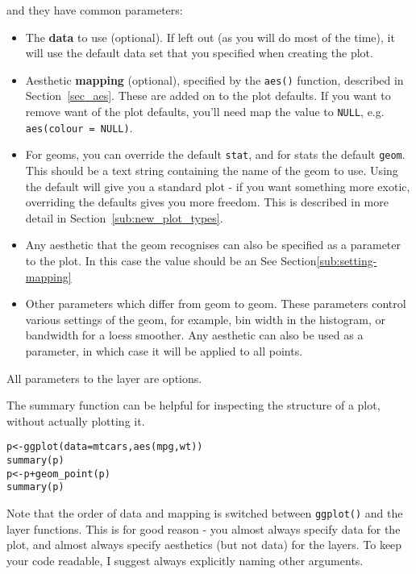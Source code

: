 \noindent and they have common parameters:

\begin{itemize}
	\item The {\bf data} to use (optional).  If left out (as you will do most of the time), it will use the default data set that you specified when creating the plot.  

	\item Aesthetic {\bf mapping} (optional), specified by the {\tt aes()} function, described in Section~\ref{sec_aes}.  These are added on to the plot defaults.  If you want to remove want of the plot defaults, you'll need map the value to {\tt NULL}, e.g. {\tt aes(colour = NULL)}.
	
	\item For geoms, you can override the default {\tt stat}, and for stats the default {\tt geom}.  This should be a text string containing the name of the geom to use.  Using the default will give you a standard plot - if you want something more exotic, overriding the defaults gives you more freedom.  This is described in more detail in Section~\ref{sub:new_plot_types}.
	
	\item Any aesthetic that the geom recognises can also be specified as a parameter to the plot.  In this case the value should be an See Section\ref{sub:setting-mapping}

	\item Other parameters which differ from geom to geom.  These parameters control various settings of the geom, for example, bin width in the histogram, or bandwidth for a loess smoother.  Any aesthetic can also be used as a parameter, in which case it will be applied to all points.
\end{itemize}

All parameters to the layer are options.

The summary function can be helpful for inspecting the structure of a plot, without actually plotting it.

\begin{alltt}
p <- ggplot(data=mtcars, aes(mpg, wt))
summary(p)
p <- p + geom_point(p)
summary(p)
\end{alltt}

Note that the order of data and mapping is switched between {\tt ggplot()} and the layer functions.  This is for good reason - you almost always specify data for the plot, and almost always specify aesthetics (but not data) for the layers.  To keep your code readable, I suggest always explicitly naming other arguments.

